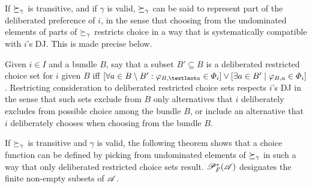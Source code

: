 \documentclass[version=last, pagesize, twoside=off, bibliography=totoc, DIV=calc, fontsize=12pt, a4paper, french, english]{scrartcl}
\renewcommand{\phi}{\varphi}%
\begin{document}
If $\succeq_\gamma$ is transitive, and if $\gamma$ is valid, $\succeq_\gamma$ can be said to represent part of the deliberated preference of $i$, in the sense that choosing from the undominated elements of parts of $\succeq_\gamma$ restricts choice in a way that is systematically compatible with $i$’s \ac{DJ}. This is made precise below.

Given $i \in I$ and a bundle $B$, say that a subset $B' \subseteq B$ is a deliberated restricted choice set for $i$ given $B$ iff $[\forall a \in B \setminus B': \phi_{B, ¬a} \in \iPhi] \lor [\exists a \in B' \suchthat \phi_{B, a} \in \iPhi]$. Restricting consideration to deliberated restricted choice sets respects $i$’s \ac{DJ} in the sense that such sets exclude from $B$ only alternatives that $i$ deliberately excludes from possible choice among the bundle $B$, or include an alternative that $i$ deliberately chooses when choosing from the bundle $B$.

If $\succeq_\gamma$ is transitive and $\gamma$ is valid, the following theorem shows that a choice function can be defined by picking from undominated elements of $\succeq_\gamma$ in such a way that only deliberated restricted choice sets result. $\powersetz[\mathit{F}]{\allalts}$ designates the finite non-empty subsets of $\mathscr{A}$.
\end{document}
